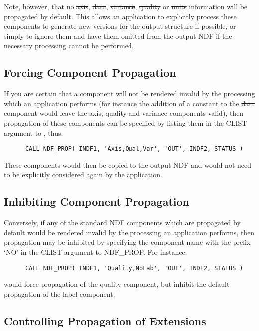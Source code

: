 Note, however, that no \st{axis}, \st{data}, \st{variance}, \st{quality\/}
or \st{units\/} information will be propagated by default. 
This allows an application to explicitly process these components to
generate new versions for the output structure if possible, or simply to
ignore them and have them omitted from the output NDF if the necessary
processing cannot be performed. 

\subsection{Forcing Component Propagation}

If you are certain that a component will not be rendered invalid by the
processing which an application performs (for instance the addition of a
constant to the \st{data\/} component would leave the \st{axis},
\st{quality\/} and \st{variance\/} components valid), then
propagation of these 
components can be specified by listing them in the CLIST argument to
, thus: 

\small
\begin{verbatim}
      CALL NDF_PROP( INDF1, 'Axis,Qual,Var', 'OUT', INDF2, STATUS )
\end{verbatim}
\normalsize

These components would then be copied to the output NDF and would not need
to be explicitly considered again by the application. 

\subsection {Inhibiting Component Propagation}

Conversely, if any of the standard NDF components which are propagated by
default would be rendered invalid by the processing an application performs,
then propagation may be inhibited by specifying the component name with the
prefix `NO' in the CLIST argument to NDF\_PROP. 
For instance:

\small
\begin{verbatim}
      CALL NDF_PROP( INDF1, 'Quality,NoLab', 'OUT', INDF2, STATUS )
\end{verbatim}
\normalsize

would force propagation of the \st{quality\/} component, but inhibit the
default propagation of the \st{label\/} component. 

\subsection{\label{ss:propagatingextensions}Controlling Propagation of Extensions}

